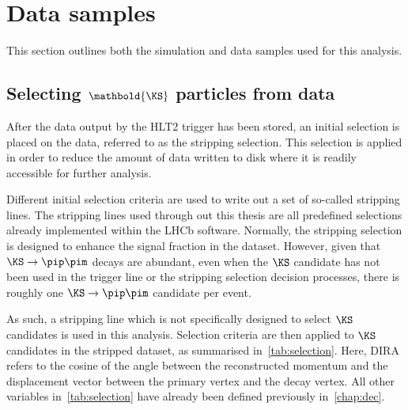 \newpage



\section{Data samples}
\label{sec:datasamples}
This section outlines both the simulation and data samples used for this analysis.
\subsection[{Selecting $K^{0}_{s}$ particles from data}]{Selecting $\mathbold{\KS}$ particles from data}

After the data output by the HLT2 trigger has been stored, an initial selection is placed on the data, referred to as the stripping selection. This selection is applied in order to reduce the amount of data written to disk where it is readily accessible for further analysis. %

Different initial selection criteria are used to write out a set of so-called stripping lines. The stripping lines used through out this thesis are all predefined selections already implemented within the LHCb software. Normally, the stripping selection is designed to enhance the signal fraction in the dataset. However, given that $\KS \to \pip\pim$ decays are abundant, even when the $\KS$ candidate has not been used in the trigger line or the stripping selection decision processes, there is roughly one $\KS\to\pip\pim$ candidate per event.

As such, a stripping line which is not specifically designed to select $\KS$ candidates is used in this analysis. Selection criteria are then applied to $\KS$ candidates in the stripped dataset, as summarised in~\autoref{tab:selection}. Here, \Gls{DIRA} refers to the cosine of the angle between the reconstructed \KS momentum and the displacement vector between the primary vertex and the \KS decay vertex. All other variables in~\autoref{tab:selection} have already been defined previously in~\autoref{chap:dec}.

